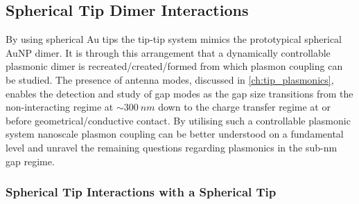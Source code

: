 \documentclass[a4paper]{article}
\begin{document}
\subsection{Spherical Tip Dimer Interactions}

By using spherical Au tips the tip-tip system mimics the prototypical spherical AuNP dimer. It is through this  arrangement that a dynamically controllable plasmonic dimer is {\color{red}recreated/created/formed} from which plasmon coupling can be studied. The presence of antenna modes, discussed in \ref{ch:tip_plasmonics}, enables the detection and study of gap modes as the gap size transitions from the non-interacting regime at $\sim\SI{300}{nm}$ down to the charge transfer regime at or before geometrical/conductive contact. By utilising such a controllable plasmonic system nanoscale plasmon coupling can be better understood on a fundamental level and unravel the remaining questions regarding plasmonics in the sub-nm gap regime.

\subsubsection{Spherical Tip Interactions with a Spherical Tip}
\end{document}
